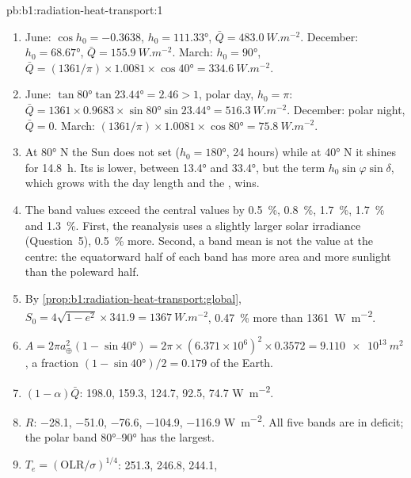 \begin{solution}{pb:b1:radiation-heat-transport:1}
\begin{enumerate}
  \item June: $\cos h_0 = -0.3638$, $h_0 = \ang{111.33}$, $\bar Q =
        \qty{483.0}{W.m^{-2}}$. December: $h_0 = \ang{68.67}$, $\bar Q =
        \qty{155.9}{W.m^{-2}}$. March: $h_0 = \ang{90}$, $\bar Q = (1361/\pi)
        \times 1.0081 \times \cos\ang{40} = \qty{334.6}{W.m^{-2}}$.
  \item June: $\tan\ang{80}\tan\ang{23.44} = 2.46 > 1$, polar day, $h_0 = \pi$:
        $\bar Q = 1361 \times 0.9683 \times \sin\ang{80}\sin\ang{23.44} =
        \qty{516.3}{W.m^{-2}}$. December: polar night, $\bar Q = 0$. March:
        $(1361/\pi) \times 1.0081 \times \cos\ang{80} = \qty{75.8}{W.m^{-2}}$.
  \item At \ang{80} N the Sun does not set ($h_0 = \ang{180}$, 24 hours) while at
        \ang{40} N it shines for \qty{14.8}{h}. Its  is lower, between
        \ang{13.4} and \ang{33.4}, but the term $h_0\sin\varphi\sin\delta$, which
        grows with the day length and the , wins.
  \item The band values exceed the central values by \qty{0.5}{\percent},
        \qty{0.8}{\percent}, \qty{1.7}{\percent}, \qty{1.7}{\percent} and
        \qty{1.3}{\percent}. First, the reanalysis uses a slightly larger solar
        irradiance (Question~5), \qty{0.5}{\percent} more. Second, a band mean is
        not the value at the centre: the equatorward half of each band has more
        area and more sunlight than the poleward half.
  \item By \cref{prop:b1:radiation-heat-transport:global}, $S_0 = 4\sqrt{1-e^2}
        \times 341.9 = \qty{1367}{W.m^{-2}}$, \qty{0.47}{\percent} more than \qty{1361}{W.m^{-2}}.
  \item $A = 2\pi a_\oplus^2(1 - \sin\ang{40}) = 2\pi \times (6.371\times10^6)^2
        \times 0.3572 = \qty{9.110e13}{m^2}$, a fraction $(1 - \sin\ang{40})/2 =
        0.179$ of the Earth.
  \item $(1 - \alpha)\bar Q$: \num{198.0}, \num{159.3}, \num{124.7}, \num{92.5},
        \num{74.7} \unit{W.m^{-2}}.
  \item $R$: \num{-28.1}, \num{-51.0}, \num{-76.6}, \num{-104.9}, \num{-116.9}
        \unit{W.m^{-2}}. All five bands are in deficit; the polar band
        \ang{80}--\ang{90} has the largest.
  \item $T_e = (\text{OLR}/\sigma)^{1/4}$: \num{251.3}, \num{246.8}, \num{244.1},

\end{enumerate}
\end{solution}
